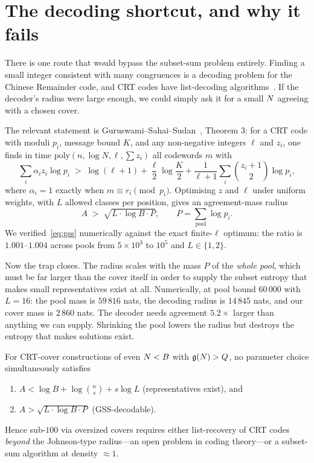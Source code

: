 \section{The decoding shortcut, and why it fails}

There is one route that would bypass the subset-sum problem entirely. Finding a
small integer consistent with many congruences is a decoding problem for the
Chinese Remainder code, and CRT codes have list-decoding
algorithms~\cite{GSS,Goldreich}. If the decoder's radius were large enough, we
could simply ask it for a small $N$ agreeing with a chosen cover.

The relevant statement is Guruswami--Sahai--Sudan~\cite{GSS}, Theorem 3: for a
CRT code with moduli $p_i$, message bound $K$, and any non-negative integers
$\ell$ and $z_i$, one finds in time $\mathrm{poly}(n,\log N,\ell,\sum z_i)$ all
codewords $m$ with
\[
\sum_i \alpha_i z_i\log p_i\;>\;\log(\ell+1)+\frac{\ell}{2}\log\frac{K}{2}
+\frac{1}{\ell+1}\sum_i\binom{z_i+1}{2}\log p_i ,
\]
where $\alpha_i=1$ exactly when $m\equiv r_i\pmod{p_i}$. Optimising $z$ and
$\ell$ under uniform weights, with $L$ allowed classes per position, gives an
agreement-mass radius
\begin{equation}\label{eq:gss}
A\;>\;\sqrt{L\cdot\log B\cdot P},\qquad P=\sum_{\text{pool}}\log p_i .
\end{equation}
We verified~\eqref{eq:gss} numerically against the exact finite-$\ell$ optimum:
the ratio is $1.001$--$1.004$ across pools from $5\times10^{3}$ to $10^{5}$ and
$L\in\{1,2\}$.

Now the trap closes. The radius scales with the mass $P$ of the \emph{whole
pool}, which must be far larger than the cover itself in order to supply the
subset entropy that makes small representatives exist at all. Numerically, at
pool bound $60\,000$ with $L=16$: the pool mass is $59\,816$ nats, the decoding
radius is $14\,845$ nats, and our cover mass is $2\,860$ nats. The decoder needs
agreement $5.2\times$ larger than anything we can supply. Shrinking the pool
lowers the radius but destroys the entropy that makes solutions exist.

\begin{theorem}\label{thm:barrier}
For CRT-cover constructions of even $N<B$ with $\mathfrak{g}(N)>Q$, no parameter choice
simultaneously satisfies
\begin{enumerate}
\item[(a)] $A<\log B+\log\binom{n}{s}+s\log L$ \quad (representatives exist), and
\item[(b)] $A>\sqrt{L\cdot\log B\cdot P}$ \quad (GSS-decodable).
\end{enumerate}
Hence sub-$100$ via oversized covers requires either list-recovery of CRT codes
\emph{beyond} the Johnson-type radius---an open problem in coding theory---or a
subset-sum algorithm at density $\approx1$.
\end{theorem}

